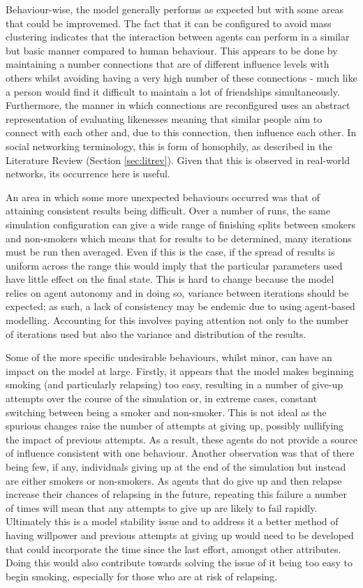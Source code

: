 \documentclass[]{report}
\begin{document}
Behaviour-wise, the model generally performs as expected but with some areas that could be improvemed. The fact that it can be configured to avoid mass clustering indicates that the interaction between agents can perform in a similar but basic manner compared to human behaviour. This appears to be done by maintaining a number connections that are of different influence levels with others whilst avoiding having a very high number of these connections - much like a person would find it difficult to maintain a lot of friendships simultaneously. Furthermore, the manner in which connections are reconfigured uses an abstract representation of evaluating likenesses meaning that similar people aim to connect with each other and, due to this connection, then influence each other. In social networking terminology, this is form of homophily, as described in the Literature Review (Section \ref{sec:litrev}). Given that this is observed in real-world networks, its occurrence here is useful.

An area in which some more unexpected behaviours occurred was that of attaining consistent results being difficult. Over a number of runs, the same simulation configuration can give a wide range of finishing splits between smokers and non-smokers which means that for results to be determined, many iterations must be run then averaged. Even if this is the case, if the spread of results is uniform across the range this would imply that the particular parameters used have little effect on the final state. This is hard to change because the model relies on agent autonomy and in doing so, variance between iterations should be expected; as such, a lack of consistency may be endemic due to using agent-based modelling. Accounting for this involves paying attention not only to the number of iterations used but also the variance and distribution of the results.

Some of the more specific undesirable behaviours, whilst minor, can have an impact on the model at large. Firstly, it appears that the model makes beginning smoking (and particularly relapsing) too easy, resulting in a number of give-up attempts over the course of the simulation or, in extreme cases, constant switching between being a smoker and non-smoker. This is not ideal as the spurious changes raise the number of attempts at giving up, possibly nullifying the impact of previous attempts. As a result, these agents do not provide a source of influence consistent with one behaviour. Another observation was that of there being few, if any, individuals giving up at the end of the simulation but instead are either smokers or non-smokers. As agents that do give up and then relapse increase their chances of relapsing in the future, repeating this failure a number of times will mean that any attempts to give up are likely to fail rapidly. Ultimately this is a model stability issue and to address it a better method of having willpower and previous attempts at giving up would need to be developed that could incorporate the time since the last effort, amongst other attributes. Doing this would also contribute towards solving the issue of it being too easy to begin smoking, especially for those who are at risk of relapsing.
\end{document}
